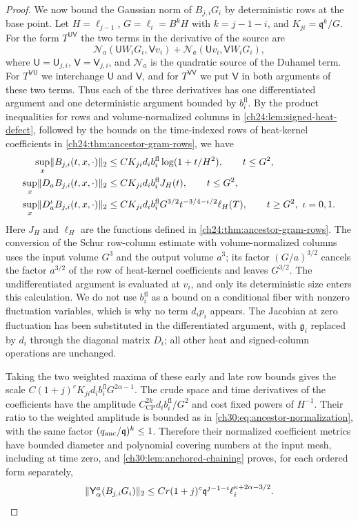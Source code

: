 \begin{proof}
We now bound the Gaussian norm of $B_{j,i}G_i$ by deterministic rows at the base point. Let $H=\ell_{j-1}$, $G=\ell_i=B^kH$ with $k=j-1-i$, and $K_{ji}=\mathfrak q^k/G$. For the form $T^{\mathsf{UV}}$ the two terms in the derivative of the source are
\[
 \mathcal N_a(\mathsf UW_iG_i,\mathsf Vv_i)+\mathcal N_a(\mathsf Uv_i,\mathsf VW_iG_i),
\]
where $\mathsf U=\mathsf U_{j,i}$, $\mathsf V=\mathsf V_{j,i}$, and $\mathcal N_a$ is the quadratic source of the Duhamel term. For $T^{\mathsf{VU}}$ we interchange $\mathsf U$ and $\mathsf V$, and for $T^{\mathsf{VV}}$ we put $\mathsf V$ in both arguments of these two terms. Thus each of the three derivatives has one differentiated argument and one deterministic argument bounded by $b_i^{\mathrm{fl}}$. By the product inequalities for rows and volume-normalized columns in \cref{ch24:lem:signed-heat-defect}, followed by the bounds on the time-indexed rows of heat-kernel coefficients in \cref{ch24:thm:ancestor-gram-rows}, we have
\begin{align*}
 \sup_x\lVert B_{j,i}(t,x,\cdot)\rVert_2&\le CK_{ji}d_ib_i^{\mathrm{fl}}\log(1+t/H^2),\qquad t\le G^2,\\
 \sup_x\lVert D_aB_{j,i}(t,x,\cdot)\rVert_2&\le CK_{ji}d_ib_i^{\mathrm{fl}}J_H(t),\qquad t\le G^2,\\
 \sup_x\lVert D_a^\iota B_{j,i}(t,x,\cdot)\rVert_2&\le CK_{ji}d_ib_i^{\mathrm{fl}}G^{3/2}t^{-3/4-\iota/2}\ell_H(T),\qquad t\ge G^2,\ \iota=0,1.
\end{align*}
Here $J_H$ and $\ell_H$ are the functions defined in \cref{ch24:thm:ancestor-gram-rows}. The conversion of the Schur row-column estimate with volume-normalized columns uses the input volume $G^3$ and the output volume $a^3$; its factor $(G/a)^{3/2}$ cancels the factor $a^{3/2}$ of the row of heat-kernel coefficients and leaves $G^{3/2}$. The undifferentiated argument is evaluated at $v_i$, and only its deterministic size enters this calculation. We do not use $b_i^{\mathrm{fl}}$ as a bound on a conditional fiber with nonzero fluctuation variables, which is why no term $d_ip_i$ appears. The Jacobian at zero fluctuation has been substituted in the differentiated argument, with $\mathfrak g_i$ replaced by $d_i$ through the diagonal matrix $D_i$; all other heat and signed-column operations are unchanged.

Taking the two weighted maxima of these early and late row bounds gives the scale $C(1+j)^cK_{ji}d_ib_i^{\mathrm{fl}}G^{2\alpha-1}$. The crude space and time derivatives of the coefficients have the amplitude $C_{\mathrm{CP}}^{2k}d_ib_i^{\mathrm{fl}}/G^2$ and cost fixed powers of $H^{-1}$. Their ratio to the weighted amplitude is bounded as in \eqref{ch30:eq:ancestor-normalization}, with the same factor $(q_{\mathrm{anc}}/\mathfrak q)^k\le1$. Therefore their normalized coefficient metrics have bounded diameter and polynomial covering numbers at the input mesh, including at time zero, and \cref{ch30:lem:anchored-chaining} proves, for each ordered form separately,
\begin{equation}\label{ch30:eq:linear-rough-innovation}
 \lVert \mathsf Y_\alpha^a(B_{j,i}G_i)\rVert_2\le Cr(1+j)^c\mathfrak q^{j-1-i}\ell_i^{\kappa+2\alpha-3/2}.
\end{equation}


\end{proof}
